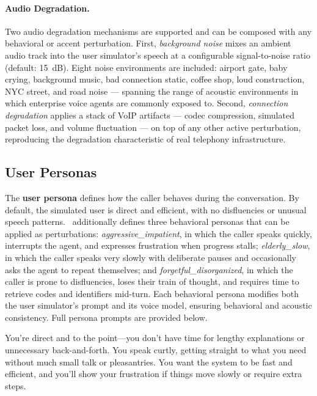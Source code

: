 \paragraph{Audio Degradation.}
Two audio degradation mechanisms are supported and can be composed with any behavioral or accent perturbation. First, \textit{background noise} mixes an ambient audio track into the user simulator's speech at a configurable signal-to-noise ratio (default: 15~dB). Eight noise environments are included: airport gate, baby crying, background music, bad connection static, coffee shop, loud construction, NYC street, and road noise — spanning the range of acoustic environments in which enterprise voice agents are commonly exposed to. Second, \textit{connection degradation} applies a stack of VoIP artifacts — codec compression, simulated packet loss, and volume fluctuation — on top of any other active perturbation, reproducing the degradation characteristic of real telephony infrastructure.

\subsection{User Personas}
\label{app:personas}

The \textbf{user persona} defines how the caller behaves during the conversation. By default, the simulated user is direct and efficient, with no disfluencies or unusual speech patterns. \framework~additionally defines three behavioral personas that can be applied as perturbations: \textit{aggressive\_impatient}, in which the caller speaks quickly, interrupts the agent, and expresses frustration when progress stalls; \textit{elderly\_slow}, in which the caller speaks very slowly with deliberate pauses and occasionally asks the agent to repeat themselves; and \textit{forgetful\_disorganized}, in which the caller is prone to disfluencies, loses their train of thought, and requires time to retrieve codes and identifiers mid-turn. Each behavioral persona modifies both the user simulator's prompt and its voice model, ensuring behavioral and acoustic consistency. Full persona prompts are provided below.

\begin{tcolorbox}[promptbox, title={\small Default Persona}]
  You're direct and to the point—you don't have time for lengthy explanations or unnecessary back-and-forth.
  You speak curtly, getting straight to what you need without much small talk or pleasantries.
  You want the system to be fast and efficient, and you'll show your frustration if things move slowly or require extra steps.
\end{tcolorbox}

